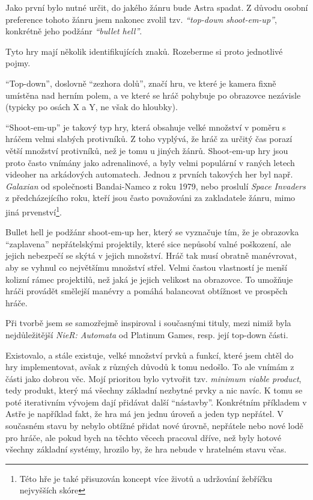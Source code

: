 \documentclass[12pt,a4paper,hidelinks]{article}
\begin{document}
Jako první bylo nutné určit, do jakého žánru bude Astra spadat. Z důvodu osobní preference tohoto žánru jsem nakonec zvolil tzv. \textit{\enquote{top-down shoot-em-up}}, konkrétně jeho podžánr \textit{\enquote{bullet hell}}.

Tyto hry mají několik identifikujících znaků. Rozeberme si proto jednotlivé pojmy.

\enquote{Top-down}, doslovně \enquote{zezhora dolů}, značí hru, ve které je kamera fixně umístěna nad herním polem, a ve které se hráč pohybuje po obrazovce nezávisle (typicky po osách X a Y, ne však do hloubky).

\enquote{Shoot-em-up} je takový typ hry, která obsahuje velké množství v poměru s hráčem velmi slabých protivníků. Z toho vyplývá, že hráč za určitý čas porazí větší množství protivníků, než je tomu u jiných žánrů. Shoot-em-up hry jsou proto často vnímány jako adrenalinové, a byly velmi populární v raných letech videoher na arkádových automatech. Jednou z prvních takových her byl např. \textit{Galaxian}\cite{galaxian} od společnosti Bandai-Namco z roku 1979, nebo proslulí \textit{Space Invaders}\cite{spaceinvaders} z předcházejícího roku, kteří jsou často považováni za zakladatele žánru, mimo jiná prvenství\footnote{Této hře je také přisuzován koncept více životů a udržování žebříčku nejvyšších skóre}.

Bullet hell je podžánr shoot-em-up her, který se vyznačuje tím, že je obrazovka \enquote{zaplavena} nepřátelskými projektily, které sice nepůsobí valné poškození, ale jejich nebezpečí se skýtá v jejich množství. Hráč tak musí obratně manévrovat, aby se vyhnul co největšímu množství střel. Velmi častou vlastností je menší kolizní rámec projektilů, než jaká je jejich velikost na obrazovce. To umožňuje hráči provádět smělejší manévry a pomáhá balancovat obtížnost ve prospěch hráče.

Při tvorbě jsem se samozřejmě inspiroval i současnými tituly, mezi nimiž byla nejdůležitější \textit{NieR: Automata}\cite{nier} od Platinum Games, resp. její top-down části.

Existovalo, a stále existuje, velké množství prvků a funkcí, které jsem chtěl do hry implementovat, avšak z různých důvodů k tomu nedošlo. To ale vnímám z části jako dobrou věc. Mojí prioritou bylo vytvořit tzv. \textit{minimum viable product}, tedy produkt, který má všechny základní nezbytné prvky a nic navíc. K tomu se poté iterativním vývojem dají přidávat další \enquote{nástavby}. Konkrétním příkladem v Astře je například fakt, že hra má jen jednu úroveň a jeden typ nepřátel. V současném stavu by nebylo obtížné přidat nové úrovně, nepřátele nebo nové lodě pro hráče, ale pokud bych na těchto věcech pracoval dříve, než byly hotové všechny základní systémy, hrozilo by, že hra nebude v hratelném stavu včas.
\end{document}
